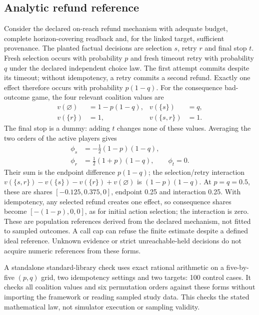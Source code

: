 \documentclass[conference]{IEEEtran}
\begin{document}
\subsection{Analytic refund reference}
Consider the declared on-reach refund mechanism with adequate budget, complete
horizon-covering readback and, for the linked target, sufficient provenance.
The planted factual decisions are selection $s$, retry $r$ and final stop $t$.
Fresh selection occurs with probability $p$ and fresh timeout retry with
probability $q$ under the declared independent choice law. The first attempt
commits despite its timeout; without idempotency, a retry commits a second
refund. Exactly one effect therefore occurs with probability $p(1-q)$.
For the consequence bad-outcome game, the four relevant coalition values are
\begin{equation}
\begin{aligned}
v(\varnothing)&=1-p(1-q), & v(\{s\})&=q,\\
v(\{r\})&=1, & v(\{s,r\})&=1.
\end{aligned}
\end{equation}
The final stop is a dummy: adding $t$ changes none of these values. Averaging
the two orders of the active players gives
\begin{equation}
\begin{aligned}
\phi_s&=-\tfrac12(1-p)(1-q),\\
\phi_r&=\tfrac12(1+p)(1-q),\qquad \phi_t=0.
\end{aligned}
\end{equation}
Their sum is the endpoint difference $p(1-q)$; the selection/retry interaction
$v(\{s,r\})-v(\{s\})-v(\{r\})+v(\varnothing)$ is $(1-p)(1-q)$.
At $p=q=0.5$, these are shares $[-0.125,0.375,0]$, endpoint 0.25 and
interaction 0.25. With idempotency, any selected refund creates one effect,
so consequence shares become $[-(1-p),0,0]$, as for initial action selection;
the interaction is zero. These are population references derived from the
declared mechanism, not fitted to sampled outcomes. A call cap can refuse the
finite estimate despite a defined ideal reference. Unknown evidence or strict
unreachable-held decisions do not acquire numeric references from these forms.

A standalone standard-library check uses exact rational arithmetic on a
five-by-five $(p,q)$ grid, two idempotency settings and two targets: 100 control
cases. It checks all coalition values and six permutation orders against these
forms without importing the framework or reading sampled study data. This
checks the stated mathematical law, not simulator execution or sampling validity.
\end{document}
